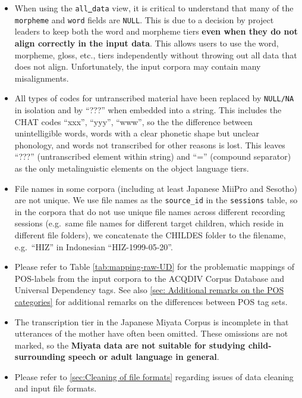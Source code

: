 \documentclass[a4paper, 11pt]{book}
\newcommand{\und}{\underline{{ }}\hspace{0.2mm}}	%
\begin{document}
\begin{itemize}
\item When using the \texttt{all\und data} view, it is critical to understand that many of the \texttt{morpheme} and \texttt{word} fields are \texttt{NULL}. This is due to a decision by project leaders to keep both the word and morpheme tiers \textbf{even when they do not align correctly in the input data}. This allows users to use the word, morpheme, gloss, etc., tiers independently without throwing out all data that does not align. Unfortunately, the input corpora may contain many misalignments.

\item All types of codes for untranscribed material have been replaced by \texttt{NULL/NA} in isolation and by “???” when embedded into a string. This includes the CHAT codes “xxx”, “yyy”, “www”, so the the difference between unintelligible words, words with a clear phonetic shape but unclear phonology, and words not transcribed for other reasons is lost. This leaves “???” (untranscribed element within string) and “=” (compound separator) as the only metalinguistic elements on the object language tiers. 

\item File names in some corpora (including at least Japanese MiiPro and Sesotho) are not unique. We use file names as the \texttt{source\_id} in the \texttt{sessions} table, so in the corpora that do not use unique file names across different recording sessions (e.g.\ same file names for different target children, which reside in different file folders), we concatenate the CHILDES folder to the filename, e.g.\ ``HIZ'' in Indonesian ``HIZ-1999-05-20''.

\item Please refer to Table \ref{tab:mapping-raw-UD} for the problematic mappings of POS-labels from the input corpora to the ACQDIV Corpus Database and Universal Dependency tags. See also \autoref{sec: Additional remarks on the POS categories} for additional remarks on the differences between POS tag sets.

\item The transcription tier in the Japanese Miyata Corpus is incomplete in that utterances of the mother have often been omitted. These omissions are not marked, so the \textbf{Miyata data are not suitable for studying child-surrounding speech or adult language in general}. 

\item Please refer to \autoref{sec:Cleaning of file formats} regarding issues of data cleaning and input file formats.


\end{itemize}
\end{document}

